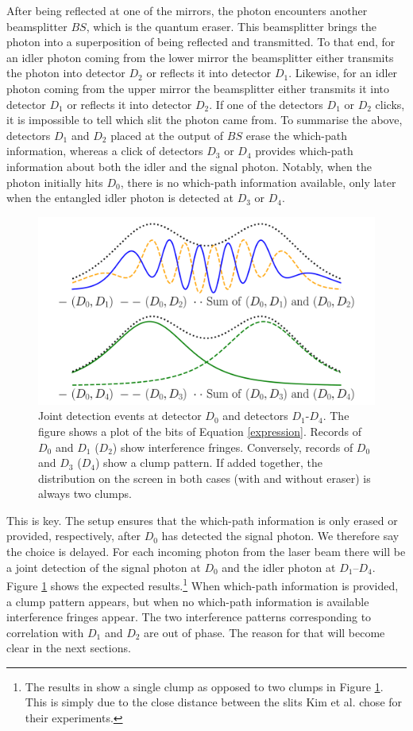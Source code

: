 \documentclass[11pt]{article}
\numberwithin{equation}{section}
\begin{document}
After being reflected at one of the mirrors, the photon encounters another beamsplitter $BS$, which is the quantum eraser. This beamsplitter brings the photon into a superposition of being reflected and transmitted. To that end, for an idler photon coming from the lower mirror the beamsplitter either transmits the photon into detector $D_2$ or reflects it into detector $D_1$. Likewise, for an idler photon coming from the upper mirror the beamsplitter either transmits it into detector $D_1$ or reflects it into detector $D_2$. If one of the detectors $D_1$ or $D_2$ clicks, it is impossible to tell which slit the photon came from. 
To summarise the above, detectors $D_1$ and $D_2$ placed at the output of $BS$ erase the which-path information, whereas a click of detectors $D_3$ or $D_4$ provides which-path information about both the idler and the signal photon. 
Notably, when the photon initially hits $D_0$, there is no which-path information available, only later when the entangled idler photon is detected at $D_3$ or $D_4$.
\begin{figure}[H]
\centering
\includegraphics[width=1\linewidth]{./inte.pdf}
\caption{Joint detection events at detector $D_0$ and detectors $D_1$-$D_4$. The figure shows a plot of the bits of Equation \ref{expression}. Records of $D_0$ and $D_1$ ($D_2$) show interference fringes. Conversely, records of $D_0$ and $D_3$ ($D_4$) show a clump pattern. If added together, the distribution on the screen in both cases (with and without eraser) is always two clumps.}
\label{fig:patterns}
\end{figure} 
This is key. The setup ensures that the which-path information is only erased or provided, respectively, after $D_0$ has detected the signal photon. We therefore say the choice is delayed.  
For each incoming photon from the laser beam there will be a joint detection of the signal photon at $D_0$ and the idler photon at $D_1$--$D_4$. Figure \ref{fig:patterns} shows the expected results.\footnote{The results in \cite{Kim1999} show a single clump as opposed to two clumps in Figure \ref{fig:patterns}. This is simply due to the close distance between the slits Kim et al. chose for their experiments.} When which-path information is provided, a clump pattern appears, but when no which-path information is available interference fringes appear. The two interference patterns corresponding to correlation with $D_1$ and $D_2$ are out of phase. The reason for that will become clear in the next sections. 
\end{document}
